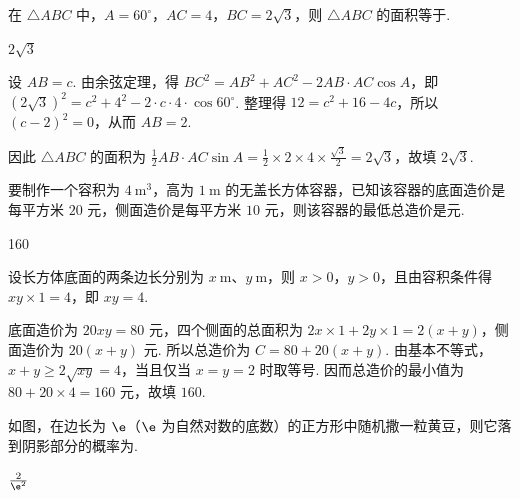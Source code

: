 \begin{problem}
在 \(\triangle ABC\) 中，\(A = 60^{\circ}\)，\(AC = 4\)，\(BC = 2\sqrt{3}\)，则 \(\triangle ABC\) 的面积等于\fillinblank{}.
\end{problem}

\begin{answer}
\(2\sqrt{3}\)
\end{answer}

\begin{solution}
设 \(AB=c\). 由余弦定理，得
\(BC^2=AB^2+AC^2-2AB\cdot AC\cos A\)，即 \((2\sqrt{3})^2=c^2+4^2-2\cdot c\cdot4\cdot\cos60^{\circ}\). 整理得 \(12=c^2+16-4c\)，所以 \((c-2)^2=0\)，从而 \(AB=2\).

因此 \(\triangle ABC\) 的面积为 \(\frac{1}{2}AB\cdot AC\sin A=\frac{1}{2}\times2\times4\times\frac{\sqrt{3}}{2}=2\sqrt{3}\)，故填 \(2\sqrt{3}\).
\end{solution}

\begin{problem}
要制作一个容积为 \(4 \mathrm{~m}^{3}\)，高为 \(1 \mathrm{~m}\) 的无盖长方体容器，已知该容器的底面造价是每平方米 \(20\text{ 元}\)，侧面造价是每平方米 \(10\text{ 元}\)，则该容器的最低总造价是\fillinblank{}\(\text{元}\).
\end{problem}

\begin{answer}
160
\end{answer}

\begin{solution}
设长方体底面的两条边长分别为 \(x\mathrm{~m}\)、\(y\mathrm{~m}\)，则 \(x>0\)，\(y>0\)，且由容积条件得 \(xy\times1=4\)，即 \(xy=4\).

底面造价为 \(20xy=80\) 元，四个侧面的总面积为 \(2x\times1+2y\times1=2(x+y)\)，侧面造价为 \(20(x+y)\) 元. 所以总造价为 \(C=80+20(x+y)\). 由基本不等式，\(x+y\geqslant2\sqrt{xy}=4\)，当且仅当 \(x=y=2\) 时取等号. 因而总造价的最小值为 \(80+20\times4=160\) 元，故填 \(160\).
\end{solution}

\begin{problem}
如图，在边长为 \(\e\)（\(\e\) 为自然对数的底数）的正方形中随机撒一粒黄豆，则它落到阴影部分的概率为\fillinblank{}.

\end{problem}

\begin{answer}
\(\frac{2}{\e^2}\)
\end{answer}


